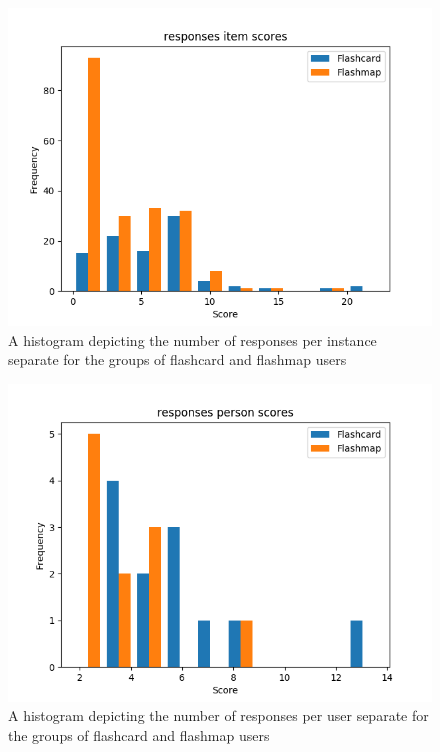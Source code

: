 \begin{figure}
    \centering
    \includegraphics[width=.7\textwidth]{img/responses_diff.png}
    \caption{A histogram depicting the number of responses per instance separate for the groups of flashcard and flashmap users}
    \label{fig:responses_diff}
\end{figure}
\begin{figure}
    \centering
    \includegraphics[width=.7\textwidth]{img/responses_abil.png}
    \caption{A histogram depicting the number of responses per user separate for the groups of flashcard and flashmap users}
    \label{fig:responses_abil}
\end{figure}

